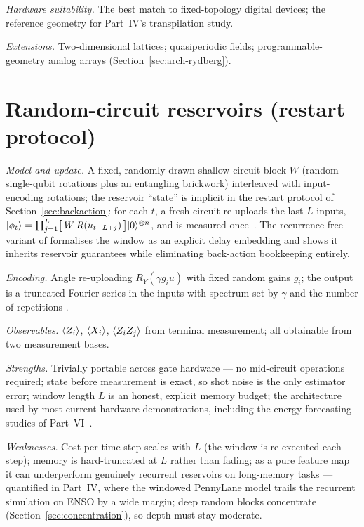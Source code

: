\emph{Hardware suitability.} The best match to fixed-topology digital devices;
the reference geometry for Part~IV's transpilation study.

\emph{Extensions.} Two-dimensional lattices; quasiperiodic fields;
programmable-geometry analog arrays (Section~\ref{sec:arch-rydberg}).

\section{Random-circuit reservoirs (restart protocol)}
\label{sec:arch-circuit}

\emph{Model and update.} A fixed, randomly drawn shallow circuit block $W$
(random single-qubit rotations plus an entangling brickwork) interleaved with
input-encoding rotations; the reservoir ``state'' is implicit in the restart
protocol of Section~\ref{sec:backaction}: for each $t$, a fresh circuit
re-uploads the last $L$ inputs,
$|\phi_t\rangle = \prod_{j=1}^{L} \bigl[\,W\, R(u_{t-L+j})\,\bigr]|0\rangle^{\otimes n}$,
and is measured once~\citep{chen2020temporal}. The recurrence-free variant of
\citet{ahmed2024prediction} formalises the window as an explicit delay
embedding and shows it inherits reservoir guarantees while eliminating
back-action bookkeeping entirely.

\emph{Encoding.} Angle re-uploading $R_Y(\gamma g_i u)$ with fixed random
gains $g_i$; the output is a truncated Fourier series in the inputs with
spectrum set by $\gamma$ and the number of repetitions
\citep{schuld2021effect}.

\emph{Observables.} $\langle Z_i\rangle$, $\langle X_i\rangle$, $\langle Z_iZ_j\rangle$ from terminal
measurement; all obtainable from two measurement bases.

\emph{Strengths.} Trivially portable across gate hardware --- no mid-circuit
operations required; state before measurement is exact, so shot noise is the
only estimator error; window length $L$ is an honest, explicit memory budget;
the architecture used by most current hardware demonstrations, including the
energy-forecasting studies of Part~VI~\citep{chen2020temporal,odo2026quantum}.

\emph{Weaknesses.} Cost per time step scales with $L$ (the window is
re-executed each step); memory is hard-truncated at $L$ rather than fading;
as a pure feature map it can underperform genuinely recurrent reservoirs on
long-memory tasks --- quantified in Part~IV, where the windowed PennyLane model
trails the recurrent simulation on ENSO by a wide margin; deep random blocks
concentrate (Section~\ref{sec:concentration}), so depth must stay moderate.

